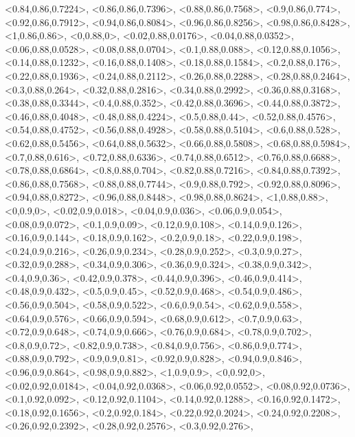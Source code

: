 \documentclass[a4paper,10pt]{article}
\begin{document}
\begin{eulernotebook}
\begin{euleroutput}
  <0.84,0.86,0.7224>,
  <0.86,0.86,0.7396>,
  <0.88,0.86,0.7568>,
  <0.9,0.86,0.774>,
  <0.92,0.86,0.7912>,
  <0.94,0.86,0.8084>,
  <0.96,0.86,0.8256>,
  <0.98,0.86,0.8428>,
  <1,0.86,0.86>,
  <0,0.88,0>,
  <0.02,0.88,0.0176>,
  <0.04,0.88,0.0352>,
  <0.06,0.88,0.0528>,
  <0.08,0.88,0.0704>,
  <0.1,0.88,0.088>,
  <0.12,0.88,0.1056>,
  <0.14,0.88,0.1232>,
  <0.16,0.88,0.1408>,
  <0.18,0.88,0.1584>,
  <0.2,0.88,0.176>,
  <0.22,0.88,0.1936>,
  <0.24,0.88,0.2112>,
  <0.26,0.88,0.2288>,
  <0.28,0.88,0.2464>,
  <0.3,0.88,0.264>,
  <0.32,0.88,0.2816>,
  <0.34,0.88,0.2992>,
  <0.36,0.88,0.3168>,
  <0.38,0.88,0.3344>,
  <0.4,0.88,0.352>,
  <0.42,0.88,0.3696>,
  <0.44,0.88,0.3872>,
  <0.46,0.88,0.4048>,
  <0.48,0.88,0.4224>,
  <0.5,0.88,0.44>,
  <0.52,0.88,0.4576>,
  <0.54,0.88,0.4752>,
  <0.56,0.88,0.4928>,
  <0.58,0.88,0.5104>,
  <0.6,0.88,0.528>,
  <0.62,0.88,0.5456>,
  <0.64,0.88,0.5632>,
  <0.66,0.88,0.5808>,
  <0.68,0.88,0.5984>,
  <0.7,0.88,0.616>,
  <0.72,0.88,0.6336>,
  <0.74,0.88,0.6512>,
  <0.76,0.88,0.6688>,
  <0.78,0.88,0.6864>,
  <0.8,0.88,0.704>,
  <0.82,0.88,0.7216>,
  <0.84,0.88,0.7392>,
  <0.86,0.88,0.7568>,
  <0.88,0.88,0.7744>,
  <0.9,0.88,0.792>,
  <0.92,0.88,0.8096>,
  <0.94,0.88,0.8272>,
  <0.96,0.88,0.8448>,
  <0.98,0.88,0.8624>,
  <1,0.88,0.88>,
  <0,0.9,0>,
  <0.02,0.9,0.018>,
  <0.04,0.9,0.036>,
  <0.06,0.9,0.054>,
  <0.08,0.9,0.072>,
  <0.1,0.9,0.09>,
  <0.12,0.9,0.108>,
  <0.14,0.9,0.126>,
  <0.16,0.9,0.144>,
  <0.18,0.9,0.162>,
  <0.2,0.9,0.18>,
  <0.22,0.9,0.198>,
  <0.24,0.9,0.216>,
  <0.26,0.9,0.234>,
  <0.28,0.9,0.252>,
  <0.3,0.9,0.27>,
  <0.32,0.9,0.288>,
  <0.34,0.9,0.306>,
  <0.36,0.9,0.324>,
  <0.38,0.9,0.342>,
  <0.4,0.9,0.36>,
  <0.42,0.9,0.378>,
  <0.44,0.9,0.396>,
  <0.46,0.9,0.414>,
  <0.48,0.9,0.432>,
  <0.5,0.9,0.45>,
  <0.52,0.9,0.468>,
  <0.54,0.9,0.486>,
  <0.56,0.9,0.504>,
  <0.58,0.9,0.522>,
  <0.6,0.9,0.54>,
  <0.62,0.9,0.558>,
  <0.64,0.9,0.576>,
  <0.66,0.9,0.594>,
  <0.68,0.9,0.612>,
  <0.7,0.9,0.63>,
  <0.72,0.9,0.648>,
  <0.74,0.9,0.666>,
  <0.76,0.9,0.684>,
  <0.78,0.9,0.702>,
  <0.8,0.9,0.72>,
  <0.82,0.9,0.738>,
  <0.84,0.9,0.756>,
  <0.86,0.9,0.774>,
  <0.88,0.9,0.792>,
  <0.9,0.9,0.81>,
  <0.92,0.9,0.828>,
  <0.94,0.9,0.846>,
  <0.96,0.9,0.864>,
  <0.98,0.9,0.882>,
  <1,0.9,0.9>,
  <0,0.92,0>,
  <0.02,0.92,0.0184>,
  <0.04,0.92,0.0368>,
  <0.06,0.92,0.0552>,
  <0.08,0.92,0.0736>,
  <0.1,0.92,0.092>,
  <0.12,0.92,0.1104>,
  <0.14,0.92,0.1288>,
  <0.16,0.92,0.1472>,
  <0.18,0.92,0.1656>,
  <0.2,0.92,0.184>,
  <0.22,0.92,0.2024>,
  <0.24,0.92,0.2208>,
  <0.26,0.92,0.2392>,
  <0.28,0.92,0.2576>,
  <0.3,0.92,0.276>,

\end{euleroutput}
\end{eulernotebook}
\end{document}
